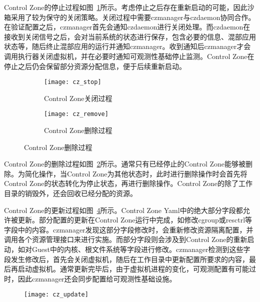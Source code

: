 Control Zone的停止过程如图~\ref{fig:cz_stop}所示。考虑停止之后存在重新启动的可能，因此沙箱采用了较为保守的关闭策略。关闭过程中需要czmanager与czdaemon协同合作。在验证配置之后，czmanager首先会通知czdaemon进行关闭处理。而czdaemon在接收到关闭信号之后，会对当前系统的状态进行保存，包含必要的信息、混部应用状态等，随后终止混部应用的运行并通知czmanager。收到通知后czmanager才会调用执行器关闭虚拟机，并在必要时通知可观测性基础停止监测。Control Zone在停止之后仍会保留部分资源分配信息，便于后续重新启动。

\begin{figure}[H]
    \centering
    \begin{subfigure}[b]{0.46\textwidth}
        \texttt{[image: cz\_stop]}
        \caption{\quad Control Zone关闭过程}
        \label{fig:cz_stop}
    \end{subfigure}
    \hfill
    \begin{subfigure}[b]{0.53\textwidth}
        \texttt{[image: cz\_remove]}
        \caption{\quad Control Zone删除过程}
        \label{fig:cz_remove}
    \end{subfigure}
\label{fig:cz_create_start}
\end{figure}

Control Zone的删除过程如图~\ref{fig:cz_remove}所示。通常只有已经停止的Control Zone能够被删除。为简化操作，当Control Zone为其他状态时，此时进行删除操作时会首先将Control Zone的状态转化为停止状态，再进行删除操作。Control Zone的除了工作目录的销毁外，还会回收已经分配的资源。

Control Zone的更新过程如图~\ref{fig:cz_update}所示。Control Zone Yaml中的绝大部分字段都允许被更新。部分配置的更新在Control Zone运行中完成，如修改cgroup或resctrl等字段中的内容。czmanager发现这部分字段修改时，会重新修改资源隔离配置，并调用各个资源管理接口来进行实施。而部分字段则会涉及到Control Zone的重新启动，如对Guest中的内核、根文件系统等字段进行修改。czmanager检测到这些字段发生修改后，首先会关闭虚拟机，随后在工作目录中更新配置所要求的内容，最后再启动虚拟机。通常更新完毕后，由于虚拟机进程的变化，可观测配置有可能过时，因此czmanager还会同步配置给可观测性基础设施。

\begin{figure}[H]
    \centering
    \texttt{[image: cz\_update]}
    \label{fig:cz_update}
\end{figure}

